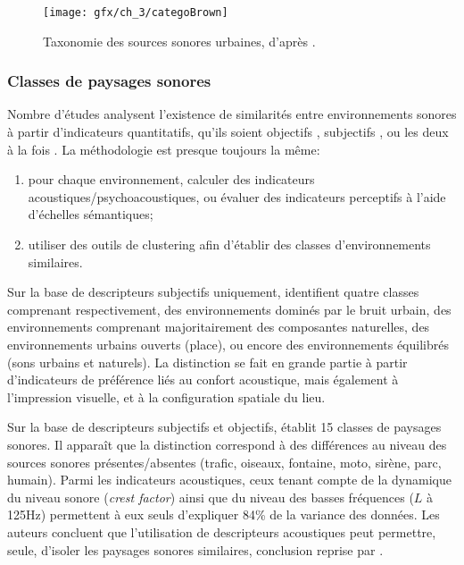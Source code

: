 \begin{figure}[t]
        \myfloatalign
        \texttt{[image: gfx/ch\_3/categoBrown]}
        \caption[Taxonomie des sources sonores urbaines.]{Taxonomie des sources sonores urbaines, d'après \citep{brown2011towards}.}\label{fig:catSoundscapeBrown}
\end{figure}

\subsubsection{Classes de paysages sonores}
\label{sec:ch3_classePaysage}

Nombre d'études analysent l'existence de similarités entre environnements sonores à partir d'indicateurs quantitatifs, qu'ils soient objectifs \citep{rychtarikova2013soundscape}, subjectifs \citep{jeon2013soundwalk}, ou les deux à la fois \citep{torija2013application,ricciardi2015sound}. La méthodologie est presque toujours la même:

\begin{enumerate}
\item pour chaque environnement, calculer des indicateurs acoustiques/psychoacoustiques, ou évaluer des indicateurs perceptifs à l'aide d'échelles sémantiques;
\item utiliser des outils de clustering afin d'établir des classes d'environnements similaires.
\end{enumerate}

Sur la base de descripteurs subjectifs uniquement, \citep{jeon2013soundwalk} identifient quatre classes comprenant respectivement, des environnements dominés par le bruit urbain, des environnements comprenant majoritairement des composantes naturelles, des environnements urbains ouverts (place), ou encore des environnements équilibrés (sons urbains et naturels). La distinction se fait en grande partie à partir d'indicateurs de préférence liés au confort acoustique, mais également à l'impression visuelle, et à la configuration spatiale du lieu.  

Sur la base de descripteurs subjectifs et objectifs, \citep{torija2013application} établit 15 classes de paysages sonores. Il apparaît que la distinction correspond à des différences au niveau des sources sonores présentes/absentes (trafic, oiseaux, fontaine, moto, sirène, parc, humain). Parmi les indicateurs acoustiques, ceux tenant compte de la dynamique du niveau sonore (\emph{crest factor}) ainsi que du niveau des basses fréquences ($L$ à 125Hz) permettent à eux seuls d'expliquer 84\% de la variance des données. Les auteurs concluent que l'utilisation de descripteurs acoustiques peut permettre, seule, d'isoler les paysages sonores similaires, conclusion reprise par \citep{rychtarikova2013soundscape}.

